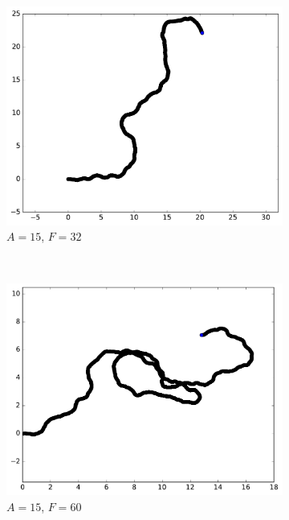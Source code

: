 \begin{figure}[htb]
\begin{subfigure}[t]{\subImgWmo}
			\includegraphics[width=\textwidth]{figures/ch3/synTraj_219_15_32}
			\caption[$A = 15$, $F=32$]{$A = 15$, $F=32$}
			\label{fig:synTraj_219_15_32}
		\end{subfigure}
		~
		\begin{subfigure}[t]{\subImgWmo}
			\centering
			\includegraphics[width=\textwidth]{figures/ch3/synTraj_219_15_60}
			\caption[$A = 15$, $F=60$]{$A = 15$, $F=60$}
			\label{fig:synTraj_219_15_60}
		\end{subfigure}
		~
		\begin{subfigure}[t]{\subImgWmo}
			\centering

\end{subfigure}
\end{figure}
